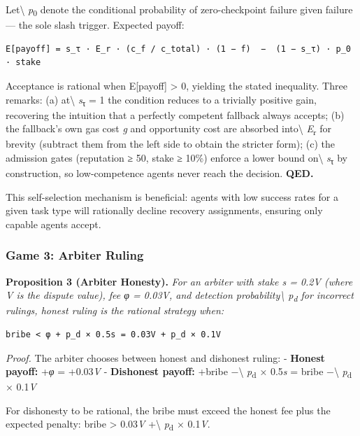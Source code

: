 \documentclass[
  10pt,
]{article}
\begin{document}
Let\textbackslash{} \emph{p}\textsubscript{0} denote the conditional
probability of zero-checkpoint failure given failure --- the sole slash
trigger. Expected payoff:

\begin{verbatim}
E[payoff] = s_τ · E_r · (c_f / c_total) · (1 − f)  −  (1 − s_τ) · p_0 · stake
\end{verbatim}

Acceptance is rational when E{[}payoff{]} \textgreater{} 0, yielding the
stated inequality. Three remarks: (a) at\textbackslash{}
\emph{s}\textsubscript{τ} = 1 the condition reduces to a trivially
positive gain, recovering the intuition that a perfectly competent
fallback always accepts; (b) the fallback's own gas cost \emph{g} and
opportunity cost are absorbed into\textbackslash{}
\emph{E}\textsubscript{r} for brevity (subtract them from the left side
to obtain the stricter form); (c) the admission gates (reputation ≥ 50,
stake ≥ 10\%) enforce a lower bound on\textbackslash{}
\emph{s}\textsubscript{τ} by construction, so low-competence agents
never reach the decision. \textbf{QED.}

This self-selection mechanism is beneficial: agents with low success
rates for a given task type will rationally decline recovery
assignments, ensuring only capable agents accept.

\hypertarget{game-3-arbiter-ruling}{%
\subsubsection{Game 3: Arbiter Ruling}\label{game-3-arbiter-ruling}}

\textbf{Proposition 3 (Arbiter Honesty).} \emph{For an arbiter with
stake s = 0.2V (where V is the dispute value), fee φ = 0.03V, and
detection probability\textbackslash{} p\textsubscript{d} for incorrect
rulings, honest ruling is the rational strategy when:}

\begin{verbatim}
bribe < φ + p_d × 0.5s = 0.03V + p_d × 0.1V
\end{verbatim}

\emph{Proof.} The arbiter chooses between honest and dishonest ruling: -
\textbf{Honest payoff:} +\emph{φ} = +0.03\emph{V} - \textbf{Dishonest
payoff:} +bribe −\textbackslash{} \emph{p}\textsubscript{d} ×
0.5\emph{s} = bribe −\textbackslash{} \emph{p}\textsubscript{d} ×
0.1\emph{V}

For dishonesty to be rational, the bribe must exceed the honest fee plus
the expected penalty: bribe \textgreater{} 0.03\emph{V}
+\textbackslash{} \emph{p}\textsubscript{d} × 0.1\emph{V}.
\end{document}
